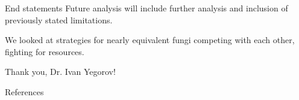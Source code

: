 \documentclass{beamer}
\begin{document}
\begin{frame}{End statements}
    Future analysis will include further analysis and inclusion of previously stated limitations.\newline
    
    We looked at strategies for nearly equivalent fungi competing with each other, fighting for resources. \newline
    
    Thank you, Dr. Ivan Yegorov!
    
\end{frame}

\begin{frame}{References}
    
    
\end{frame}
\end{document}
